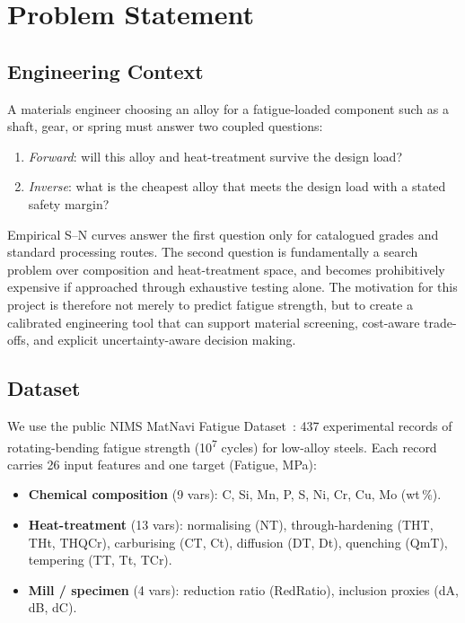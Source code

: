 \documentclass[12pt,a4paper]{article} %
\begin{document}
\section{Problem Statement}

\subsection{Engineering Context}
A materials engineer choosing an alloy for a fatigue-loaded component such as a shaft,
gear, or spring must answer two coupled questions:
\begin{enumerate}[nosep]
  \item \emph{Forward}: will this alloy and heat-treatment survive the design load?
  \item \emph{Inverse}: what is the cheapest alloy that meets the design load with a
        stated safety margin?
\end{enumerate}
Empirical S--N curves answer the first question only for catalogued grades and standard
processing routes. The second question is fundamentally a search problem over
composition and heat-treatment space, and becomes prohibitively expensive if approached
through exhaustive testing alone. The motivation for this project is therefore not merely
to predict fatigue strength, but to create a calibrated engineering tool that can support
material screening, cost-aware trade-offs, and explicit uncertainty-aware decision making.

\subsection{Dataset}
We use the public NIMS MatNavi Fatigue Dataset~\cite{agrawal2014}: 437 experimental records
of rotating-bending fatigue strength (10\textsuperscript{7} cycles) for low-alloy steels.
Each record carries 26 input features and one target (Fatigue, MPa):
\begin{itemize}[nosep]
  \item \textbf{Chemical composition} (9 vars): C, Si, Mn, P, S, Ni, Cr, Cu, Mo (wt\,\%).
  \item \textbf{Heat-treatment} (13 vars): normalising (NT), through-hardening (THT, THt,
        THQCr), carburising (CT, Ct), diffusion (DT, Dt), quenching (QmT), tempering (TT,
        Tt, TCr).
  \item \textbf{Mill / specimen} (4 vars): reduction ratio (RedRatio), inclusion proxies
        (dA, dB, dC).
\end{itemize}
\end{document}
